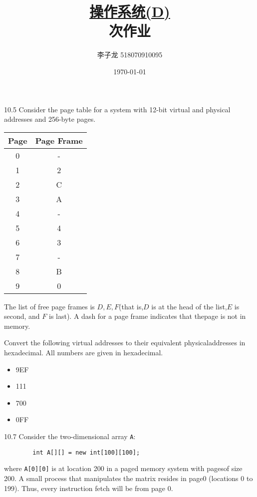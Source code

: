\documentclass[12pt,a4paper]{article}
\newenvironment{problems}{\begin{list}{}{\renewcommand{\makelabel}[1]{\textbf{##1}\hfil}}}{\end{list}}
\begin{document}
\title{\normalsize \underline{操作系统(D)}\\ 次作业}
\author{李子龙 518070910095}
\date{\today}
\maketitle

\begin{problems}
    \item[10.5] Consider the page table for a system with 12-bit virtual and physical addresses and 256-byte pages.
    
    \begin{tabular}{cc}
        \hline
        Page & Page Frame \\
        \hline
        0 & - \\
        1 & 2 \\
        2 & C \\
        3 & A \\
        4 & - \\
        5 & 4 \\
        6 & 3 \\
        7 & - \\
        8 & B \\
        9 & 0 \\
        \hline
    \end{tabular}

    The list of free page frames is $D,E,F$(that is,$D$ is at the head of the list,$E$ is second, and $F$ is last). A dash for a page frame indicates that thepage is not in memory.
    
    Convert the following virtual addresses to their equivalent physicaladdresses in hexadecimal. All numbers are given in hexadecimal.

    \begin{itemize}
        \item 9EF
        \item 111
        \item 700
        \item 0FF
    \end{itemize}
    \item[10.7] Consider the two-dimensional array \verb"A":
    \begin{verbatim}
        int A[][] = new int[100][100];
    \end{verbatim} 
    where \verb"A[0][0]" is at location 200 in a paged memory system with pagesof size 200. A small process that manipulates the matrix resides in page0 (locations 0 to 199). Thus, every instruction fetch will be from page 0.
    

\end{problems}
\end{document}
